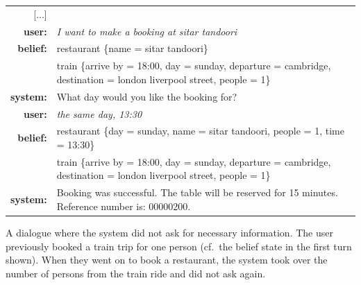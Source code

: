 \documentclass[11pt,a4paper]{article}
\begin{document}
\begin{example}[tpbh]
\small
\setlength{\tabcolsep}{2pt}
\begin{mdframed}[style=ExampleFrame]
\begin{tabularx}{\textwidth}{rX}
[...] \\
\bf user: & \it I want to make a booking at sitar tandoori \\
\bf belief: & restaurant \{name = sitar tandoori\} \\
& train \{arrive by = 18:00, day = sunday, departure = cambridge, destination = london liverpool street, people = 1\} \\
\bf system: & What day would you like the booking for? \\
\bf user: & \it the same day, 13:30 \\
\bf belief: & restaurant \{day = sunday, name = sitar tandoori, people = 1, time = 13:30\} \\
& train \{arrive by = 18:00, day = sunday, departure = cambridge, destination = london liverpool street, people = 1\} \\
\bf system: & Booking was successful. The table will be reserved for 15 minutes. Reference number is: 00000200. \\
\end{tabularx}
\end{mdframed}
\caption{A dialogue where the system did not ask for necessary information. The user previously booked a train trip for one person (cf.~the belief state in the first turn shown). When they went on to book a restaurant, the system took over the number of persons from the train ride and did not ask again.\label{ex:error1}}
\end{example}
\end{document}
